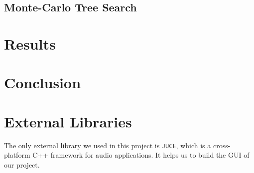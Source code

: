 \documentclass[letterpaper]{article}
\begin{document}
\subsection{Monte-Carlo Tree Search}
\label{subsec:monte-carlo-tree-search}



\section{Results}\label{sec:results}


\section{Conclusion}\label{sec:conclusion}


\section{External Libraries}\label{sec:acknowledgements}

The only external library we used in this project is \texttt{JUCE}, which is a cross-platform C++ framework for audio applications.
It helps us to build the GUI of our project.



\end{document}
